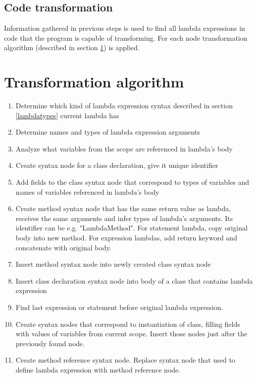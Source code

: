 \documentclass[]{report}
\begin{document}
    \subsection{Code transformation}
    
    Information gathered in previous steps is used to find all lambda expressions in code that the program is capable of transforming. For each node transformation algorithm (described in section \ref{transalgorithm}) is applied.
    
    \section{Transformation algorithm}\label{transalgorithm}
    \begin{enumerate}
      \item {Determine which kind of lambda expression syntax described in section  \ref{lambdatypes} current lambda has}
   \item Determine names and types of lambda expression arguments
   \item Analyze what variables from the scope are referenced in lambda's body
   \item Create syntax node for a class declaration, give it unique identifier
   \item Add fields to the class syntax node that correspond to types of variables and names of variables referenced in lambda's body
   \item Create method syntax node that has the same return value as lambda, receives the same arguments and infer types of lambda's arguments. Its identifier can be e.g. "LambdaMethod". For statement lambda, copy original body into new method. For expression lambdas, add return keyword and concatenate with original body.
   \item Insert method syntax node into newly created class syntax node
   \item Insert class declaration syntax node into body of a class that contains lambda expression
   \item Find last expression or statement before original lambda expression.
   \item Create syntax nodes that correspond to instantiation of class, filling fields with values of variables from current scope. Insert those nodes just after the previously found node.
    \item Create method reference syntax node. Replace syntax node that used to define lambda expression with method reference node.
    \end{enumerate}
    
\end{document}
